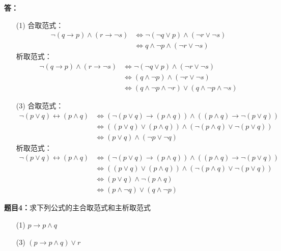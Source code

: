 \documentclass[10pt,CCT]{ctexart}
\begin{document}
\vspace{5pt}
\noindent
{\bf 答：}
\begin{enumerate}
    \item[(1)] 合取范式：
    \begin{align*}
        \neg(q\rightarrow p) \wedge (r \rightarrow \neg s) &\Leftrightarrow \neg(\neg q\vee p) \wedge (\neg r\vee \neg s)\\
        &\Leftrightarrow q \wedge \neg p \wedge (\neg r \vee \neg s)
    \end{align*}析取范式：
    \begin{align*}
        \neg(q\rightarrow p) \wedge (r \rightarrow \neg s) &\Leftrightarrow \neg(\neg q\vee p) \wedge (\neg r\vee \neg s)\\
        &\Leftrightarrow (q \wedge \neg p) \wedge (\neg r \vee \neg s)\\
        &\Leftrightarrow (q \wedge \neg p \wedge \neg r) \vee (q \wedge \neg p \wedge \neg s)
    \end{align*}
    \item[(3)] 合取范式：
    \begin{align*}
        \neg(p\vee q) \leftrightarrow (p \wedge q) &\Leftrightarrow (\neg(p\vee q) \rightarrow (p \wedge q)) \wedge((p \wedge q) \rightarrow \neg(p\vee q))\\
        &\Leftrightarrow ((p\vee q) \vee (p \wedge q)) \wedge (\neg(p \wedge q) \vee \neg(p\vee q))\\
        &\Leftrightarrow (p\vee q)\wedge (\neg p\vee \neg q)
    \end{align*}析取范式：
    \begin{align*}
        \neg(p\vee q) \leftrightarrow (p \wedge q) &\Leftrightarrow (\neg(p\vee q) \rightarrow (p \wedge q)) \wedge((p \wedge q) \rightarrow \neg(p\vee q))\\
        &\Leftrightarrow ((p\vee q) \vee (p \wedge q)) \wedge (\neg(p \wedge q) \vee \neg(p\vee q))\\
        &\Leftrightarrow (p\vee q)\wedge \neg(p\wedge q)\\
        &\Leftrightarrow (p\wedge \neg q)\vee (q\wedge \neg p)
    \end{align*}
    \end{enumerate}
\noindent

\vspace{10pt}
\noindent
{\bf 题目4：}求下列公式的主合取范式和主析取范式
\begin{enumerate}
\item[(1)] $p\rightarrow p \wedge q$
\item[(3)] $(p\rightarrow p\wedge q)\vee r$
\end{enumerate}
\end{document}

